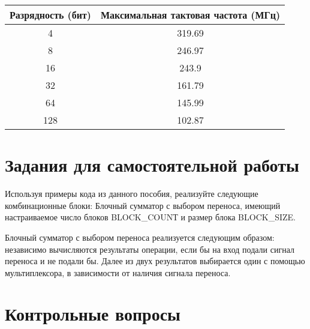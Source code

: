 \documentclass[a4paper,14pt]{article}
\begin{document}
	\begin{table}[H]
		\begin{center}
			\begin{flushleft}
			\end{flushleft}
			\label{tab:task_5}
			\begin{tabular}{|c|c|}
				\hline
				Разрядность (бит)   & Максимальная тактовая частота (МГц)      \\ \hline
				4   & 319.69 \\ \hline
				8   & 246.97 \\ \hline
				16  & 243.9  \\ \hline
				32  & 161.79 \\ \hline
				64  & 145.99 \\ \hline
				128 & 102.87 \\ \hline
			\end{tabular}
		\end{center}
	\end{table}

	\section{Задания для самостоятельной работы}
	
	Используя примеры кода из данного пособия, реализуйте следующие комбинационные
	блоки:
	Блочный сумматор с выбором переноса, имеющий настраиваемое число блоков
	BLOCK\_COUNТ и размер блока BLOCK\_SIZE.
	
	
	Блочный сумматор с выбором переноса реализуется следующим образом:
	независимо вычисляются результаты операции, если бы на вход подали сигнал переноса и не подали бы.
	Далее из двух результатов выбирается один с помощью мультиплексора, в зависимости от наличия сигнала переноса.
	
	
	
	\section{Контрольные вопросы}
	
\end{document}
